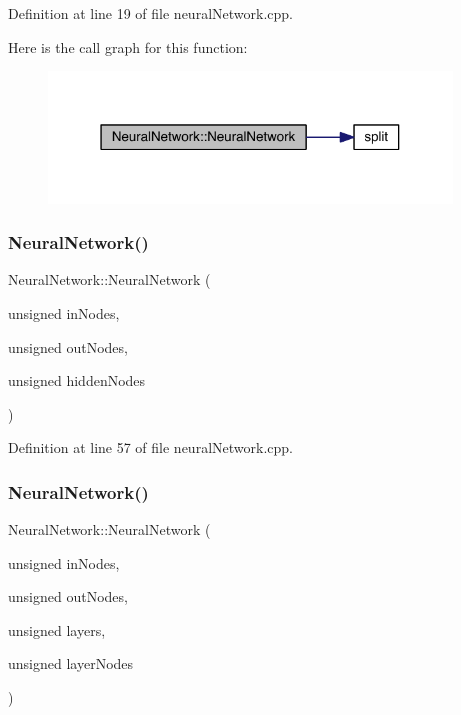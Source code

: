 Definition at line 19 of file neural\+Network.\+cpp.

Here is the call graph for this function\+:\nopagebreak
\begin{figure}[H]
\begin{center}
\leavevmode
\includegraphics[width=304pt]{class_neural_network_ac46a25af2f5a1706adf9e798970939bb_cgraph}
\end{center}
\end{figure}
\mbox{\label{class_neural_network_aed4b8a61c6cf3e0af6ff9976bf9c4190}} 
\subsubsection{\texorpdfstring{Neural\+Network()}{NeuralNetwork()}\hspace{0.1cm}{\footnotesize\ttfamily [2/3]}}
{\footnotesize\ttfamily Neural\+Network\+::\+Neural\+Network (\begin{DoxyParamCaption}\item[{unsigned}]{in\+Nodes,  }\item[{unsigned}]{out\+Nodes,  }\item[{unsigned}]{hidden\+Nodes }\end{DoxyParamCaption})}



Definition at line 57 of file neural\+Network.\+cpp.

\mbox{\label{class_neural_network_a4cdce541dada0debf1022e3951b8d8cb}} 
\subsubsection{\texorpdfstring{Neural\+Network()}{NeuralNetwork()}\hspace{0.1cm}{\footnotesize\ttfamily [3/3]}}
{\footnotesize\ttfamily Neural\+Network\+::\+Neural\+Network (\begin{DoxyParamCaption}\item[{unsigned}]{in\+Nodes,  }\item[{unsigned}]{out\+Nodes,  }\item[{unsigned}]{layers,  }\item[{unsigned}]{layer\+Nodes }\end{DoxyParamCaption})}



